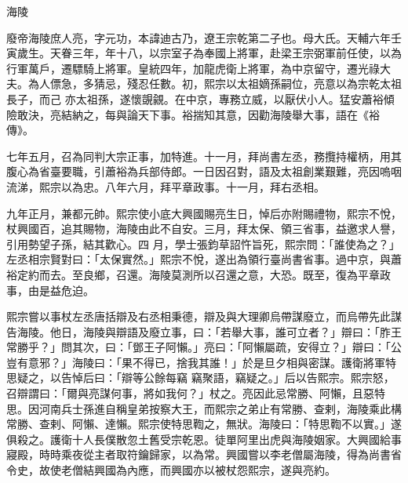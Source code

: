 
\begin{pinyinscope}

 海陵



 廢帝海陵庶人亮，字元功，本諱迪古乃，遼王宗乾第二子也。母大氏。天輔六年壬寅歲生。天眷三年，年十八，以宗室子為奉國上將軍，赴梁王宗弼軍前任使，以為行軍萬戶，遷驃騎上將軍。皇統四年，加龍虎衛上將軍，為中京留守，遷光祿大夫。為人僄急，多猜忌，殘忍任數。初，熙宗以太祖嫡孫嗣位，亮意以為宗乾太祖長子，而己
 亦太祖孫，遂懷覬覦。在中京，專務立威，以厭伏小人。猛安蕭裕傾險敢決，亮結納之，每與論天下事。裕揣知其意，因勸海陵舉大事，語在《裕傳》。



 七年五月，召為同判大宗正事，加特進。十一月，拜尚書左丞，務攬持權柄，用其腹心為省臺要職，引蕭裕為兵部侍郎。一日因召對，語及太祖創業艱難，亮因嗚咽流涕，熙宗以為忠。八年六月，拜平章政事。十一月，拜右丞相。



 九年正月，兼都元帥。熙宗使小底大興國賜亮生日，悼后亦附賜禮物，熙宗不悅，杖興國百，追其賜物，海陵由此不自安。三月，拜太保、領三省事，益邀求人譽，引用勢望子孫，結其歡心。四
 月，學士張鈞草詔忤旨死，熙宗問：「誰使為之？」左丞相宗賢對曰：「太保實然。」熙宗不悅，遂出為領行臺尚書省事。過中京，與蕭裕定約而去。至良鄉，召還。海陵莫測所以召還之意，大恐。既至，復為平章政事，由是益危迫。



 熙宗嘗以事杖左丞唐括辯及右丞相秉德，辯及與大理卿烏帶謀廢立，而烏帶先此謀告海陵。他日，海陵與辯語及廢立事，曰：「若舉大事，誰可立者？」辯曰：「胙王常勝乎？」問其次，曰：「鄧王子阿懶。」亮曰：「阿懶屬疏，安得立？」辯曰：「公豈有意邪？」海陵曰：「果不得已，捨我其誰！」於是旦夕相與密謀。護衛將軍特思疑之，以告悼后曰：「辯等公餘每竊
 竊聚語，竊疑之。」后以告熙宗。熙宗怒，召辯謂曰：「爾與亮謀何事，將如我何？」杖之。亮因此忌常勝、阿懶，且惡特思。因河南兵士孫進自稱皇弟按察大王，而熙宗之弟止有常勝、查剌，海陵乘此構常勝、查剌、阿懶、達懶。熙宗使特思鞫之，無狀。海陵曰：「特思鞫不以實。」遂俱殺之。護衛十人長僕散忽土舊受宗乾恩。徒單阿里出虎與海陵姻家。大興國給事寢殿，時時乘夜從主者取符鑰歸家，以為常。興國嘗以李老僧屬海陵，得為尚書省令史，故使老僧結興國為內應，而興國亦以被杖怨熙宗，遂與亮約。




\end{pinyinscope}
